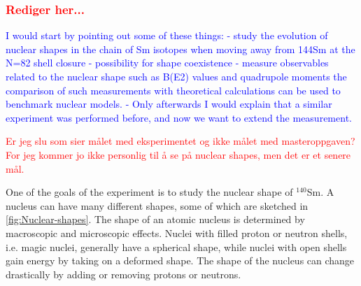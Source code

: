 \documentclass[twoside,english]{uiofysmaster/uiofysmaster}
\newcommand{\Sm}{$^{140}$Sm} %
\let\orgautoref\autoref
\renewcommand{\autoref}
        {%
		 \def\sectionautorefname{Section}%
		 \def\subsectionautorefname{Section}%
		 \def\subsubsectionautorefname{Section}%
		 \def\chapterautorefname{Chapter}%
          \orgautoref}
\begin{document}



\subsubsection*{\textcolor{red}{Rediger her...}}

\textcolor{blue}{I would start by pointing out some of these things:
- study the evolution of nuclear shapes in the chain of Sm isotopes when moving away from 144Sm at the N=82 shell closure
- possibility for shape coexistence
- measure observables related to the nuclear shape such as B(E2) values and quadrupole moments
the comparison of such measurements with theoretical calculations can be used to benchmark nuclear models.
- Only afterwards I would explain that a similar experiment was performed before, and now we want to extend the measurement.}

\bigskip

\textcolor{red}{Er jeg slu som sier målet med eksperimentet og ikke målet med masteroppgaven? For jeg kommer jo ikke personlig til å se på nuclear shapes, men det er et senere mål.}


One of the goals of the experiment is to study the nuclear shape of \Sm. 
A nucleus can have many different shapes, some of which are sketched in \autoref{fig:Nuclear-shapes}.
The shape of an atomic nucleus is determined by macroscopic and microscopic effects. 
Nuclei with filled proton or neutron shells, i.e. magic nuclei, generally have a spherical shape, while nuclei with open shells gain energy by taking on a deformed shape.
The shape of the nucleus can change drastically by adding or removing protons or neutrons.
\end{document}
